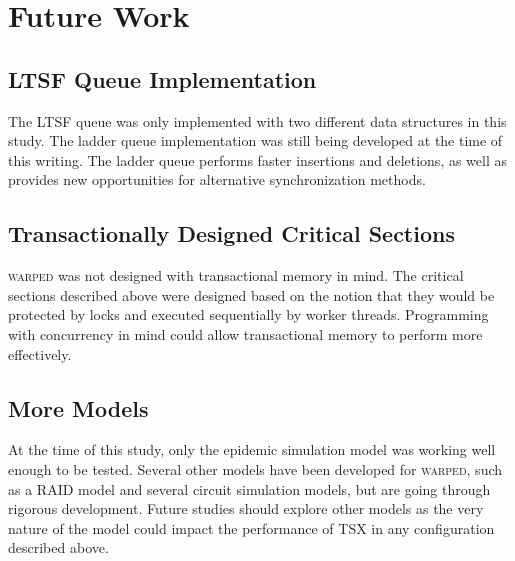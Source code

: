 \documentclass[11pt]{book}
\begin{document}
\section{Future Work}

\subsection{LTSF Queue Implementation}

The LTSF queue was only implemented with two different data structures in this study.  The
ladder queue implementation was still being developed at the time of this writing.  The
ladder queue performs faster insertions and deletions, as well as provides new
opportunities for alternative synchronization methods.

\subsection{Transactionally Designed Critical Sections}

\textsc{warped} was not designed with transactional memory in mind.  The
critical sections described above were designed based on the notion that they
would be protected by locks and executed sequentially by worker threads.
Programming with concurrency in mind could allow transactional memory to perform
more effectively.

\subsection{More Models}

At the time of this study, only the epidemic simulation model was working well enough to
be tested.  Several other models have been developed for \textsc{warped}, such as a RAID
model and several circuit simulation models, but are going through rigorous development.
Future studies should explore other models as the very nature of the model could impact
the performance of TSX in any configuration described above.

\newpage


\end{document}
